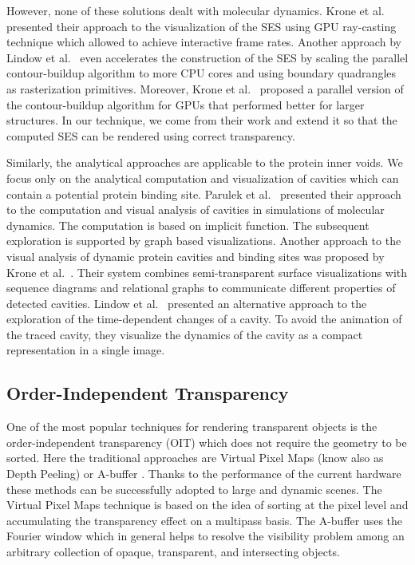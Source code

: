 However, none of these solutions dealt with molecular dynamics. 
Krone et al.~\cite{krone2009interactive} presented their approach to the visualization of the SES using GPU ray-casting technique which allowed to achieve interactive frame rates. 
Another approach by Lindow et al.~\cite{lindow2010accelerated} even accelerates the construction of the SES by scaling the parallel contour-buildup algorithm to more CPU cores and using boundary quadrangles as rasterization primitives.
Moreover, Krone et al.~\cite{krone2011parallel} proposed a parallel version of the contour-buildup algorithm for GPUs that performed better for larger structures.
In our technique, we come from their work and extend it so that the computed SES can be rendered using correct transparency.

Similarly, the analytical approaches are applicable to the protein inner voids. 
We focus only on the analytical computation and visualization of cavities which can contain a potential protein binding site.
Parulek et al.~\cite{parulek2013visual} presented their approach to the computation and visual analysis of cavities in simulations of molecular dynamics.
The computation is based on implicit function. 
The subsequent exploration is supported by graph based visualizations.
Another approach to the visual analysis of dynamic protein cavities and binding sites was proposed by Krone et al.~\cite{Krone2014}.
Their system combines semi-transparent surface visualizations with sequence diagrams and relational graphs to communicate different properties of detected cavities.
Lindow et al.~\cite{Lindow2013} presented an alternative approach to the exploration of the time-dependent changes of a cavity. 
To avoid the animation of the traced cavity, they visualize the dynamics of the cavity as a compact representation in a single image. 

\subsection{Order-Independent Transparency}
One of the most popular techniques for rendering transparent objects is the order-independent transparency (OIT) which does not require the geometry to be sorted.
Here the traditional approaches are Virtual Pixel Maps (know also as Depth Peeling) \cite{mammen1989transparency} or A-buffer \cite{carpenter1984abuffer}.
Thanks to the performance of the current hardware these methods can be successfully adopted to large and dynamic scenes.
The Virtual Pixel Maps technique is based on the idea of sorting at the pixel level and accumulating the transparency effect on a multipass basis. 
The A-buffer uses the Fourier window which in general helps to resolve the visibility problem among an arbitrary collection of opaque, transparent, and intersecting objects.

